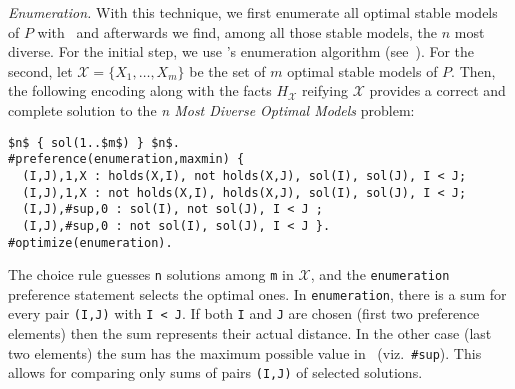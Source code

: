 
\emph{Enumeration.}
%
With this technique, we first enumerate all optimal stable models of $P$ with \asprin\
and afterwards we find, among all those stable models, the $n$ most diverse.
%
For the initial step, we use \asprin{}'s enumeration algorithm (see~\cite{brderosc15a}).
For the second, let $\mathcal{X}=\{ X_1, \ldots, X_m \}$ be the set of $m$ optimal stable models of $P$.
Then, the following encoding along with the facts $H_\mathcal{X}$ reifying $\mathcal{X}$ 
provides a correct and complete solution to the \emph{n Most Diverse Optimal Models} problem:
\begin{lstlisting}[mathescape=true,numbers=none]
$n$ { sol(1..$m$) } $n$.
#preference(enumeration,maxmin) { 
  (I,J),1,X : holds(X,I), not holds(X,J), sol(I), sol(J), I < J; 
  (I,J),1,X : not holds(X,I), holds(X,J), sol(I), sol(J), I < J;
  (I,J),#sup,0 : sol(I), not sol(J), I < J ;
  (I,J),#sup,0 : not sol(I), sol(J), I < J }.
#optimize(enumeration).  
\end{lstlisting}
The choice rule guesses \lstinline!n! solutions among \lstinline!m! in $\mathcal{X}$, 
and the \lstinline!enumeration! preference statement selects the optimal ones.
In \lstinline!enumeration!, there is a sum for every pair \lstinline!(I,J)! with \lstinline!I < J!.
If both \lstinline!I! and \lstinline!J! are chosen (first two preference elements) 
then the sum represents their actual distance.
In the other case (last two elements) the sum has the maximum possible value  in \asprin\
(viz.~\lstinline!#sup!).
This allows for comparing only sums of pairs \lstinline!(I,J)! of selected solutions.

